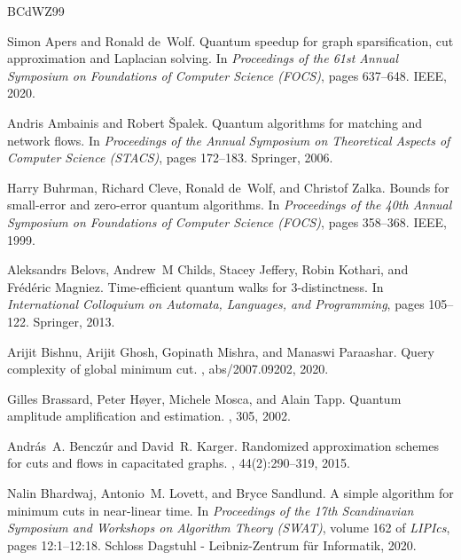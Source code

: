 \newcommand{\etalchar}[1]{$^{#1}$}
\begin{thebibliography}{BCdWZ99}

Simon Apers and Ronald de~Wolf.
\newblock Quantum speedup for graph sparsification, cut approximation and
  {L}aplacian solving.
\newblock In {\em Proceedings of the 61st Annual Symposium on Foundations of
  Computer Science (FOCS)}, pages 637--648. IEEE, 2020.

Andris Ambainis and Robert {\v{S}}palek.
\newblock Quantum algorithms for matching and network flows.
\newblock In {\em Proceedings of the Annual Symposium on Theoretical Aspects of
  Computer Science (STACS)}, pages 172--183. Springer, 2006.

Harry Buhrman, Richard Cleve, Ronald de~Wolf, and Christof Zalka.
\newblock Bounds for small-error and zero-error quantum algorithms.
\newblock In {\em Proceedings of the 40th Annual Symposium on Foundations of
  Computer Science (FOCS)}, pages 358--368. IEEE, 1999.

\bibitem[BCJ{\etalchar{+}}13]{B13}
Aleksandrs Belovs, Andrew~M Childs, Stacey Jeffery, Robin Kothari, and
  Fr{\'e}d{\'e}ric Magniez.
\newblock Time-efficient quantum walks for 3-distinctness.
\newblock In {\em International Colloquium on Automata, Languages, and
  Programming}, pages 105--122. Springer, 2013.

Arijit Bishnu, Arijit Ghosh, Gopinath Mishra, and Manaswi Paraashar.
\newblock Query complexity of global minimum cut.
, abs/2007.09202, 2020.

Gilles Brassard, Peter H{\o}yer, Michele Mosca, and Alain Tapp.
\newblock Quantum amplitude amplification and estimation.
, 305, 2002.

Andr{\'{a}}s~A. Bencz{\'{u}}r and David~R. Karger.
\newblock Randomized approximation schemes for cuts and flows in capacitated
  graphs.
, 44(2):290--319, 2015.

Nalin Bhardwaj, Antonio~M. Lovett, and Bryce Sandlund.
\newblock A simple algorithm for minimum cuts in near-linear time.
\newblock In {\em Proceedings of the 17th Scandinavian Symposium and Workshops
  on Algorithm Theory (SWAT)}, volume 162 of {\em LIPIcs}, pages 12:1--12:18.
  Schloss Dagstuhl - Leibniz-Zentrum f{\"{u}}r Informatik, 2020.
  

\end{thebibliography}
